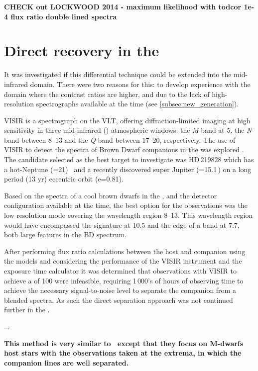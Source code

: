 \textbf{
CHECK out LOCKWOOD 2014 - maximum likelihood with todcor 1e-4 flux ratio double lined spectra}




\section{Direct recovery in the \mir{}}
It was investigated if this differential technique could be extended into the mid-infrared {\mir{}} domain.
There were two reasons for this: to develop experience with the {\mir{}} domain where the contrast ratios are higher, and due to the lack of high-resolution \nir{} spectrographs available at the time (see \cref{subsec:new_generation}).

{VISIR} is a \mir{} spectrograph on the {VLT}, offering diffraction-limited imaging at high sensitivity in three mid-infrared (\mir) atmospheric windows: the \emph{M}-band at 5\um{}, the \emph{N}-band between 8--13\um{} and the \emph{Q}-band between 17--20\um{}, respectively.
The use of {VISIR} to detect the spectra of Brown Dwarf companions in the {\mir{}} was explored .
The candidate selected as the best target to investigate was {HD\,219828} which has a hot-Neptune (\mtwosini{}=21\Mearth)~\citep{melo_new_2007} and a recently discovered super Jupiter (\mtwosini{}=15.1\,\Mjup) on a long period (13 yr) eccentric orbit (e=0.81)\citep{santos_extreme_2016}.

Based on the spectra of a cool brown dwarfs in the \mir{}, and the detector configuration available at the time, the best option for the observations was the low resolution mode covering the wavelength region 8--13\um{}.
This wavelength region would have encompassed the  signature at 10.5\um{} and the edge of  a  band at 7.7\um{}, both large features in the BD \mir{} spectrum.

After performing flux ratio calculations between the host and companion using the \citet{baraffe_evolutionary_2003} models and considering the performance of the {VISIR} instrument and the exposure time calculator it was determined that observations with {VISIR} to achieve a \snr{} of 100 were infeasible, requiring 1\,000's of hours of observing time to achieve the necessary signal-to-noise level to separate the companion from a blended spectra.
As such the direct separation approach was not continued further in the \mir{}.



...

\textbf{This method is very similar to~\citet{kostogryz_spectral_2013} except that they focus on M-dwarfs host stars with the observations taken at the extrema, in which the companion lines are well separated. 
}
